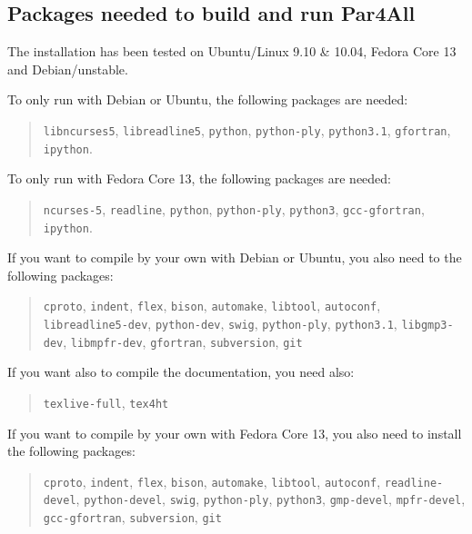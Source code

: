 \documentclass[a4paper]{article}
\begin{document}
\subsection{Packages needed to build and run Par4All}
\label{sec:pack-need-build}

The installation has been tested on Ubuntu/Linux 9.10 \& 10.04,
Fedora Core 13 and Debian/unstable.

To only run \Apfa with Debian or Ubuntu, the following packages are needed:
\begin{quote}
  \texttt{libncurses5}, \texttt{libreadline5}, \texttt{python},
  \texttt{python-ply}, \texttt{python3.1}, \texttt{gfortran},
  \texttt{ipython}.
\end{quote}

To only run \Apfa with Fedora Core 13, the following packages are needed:
\begin{quote}
  \texttt{ncurses-5}, \texttt{readline}, \texttt{python},
  \texttt{python-ply}, \texttt{python3}, \texttt{gcc-gfortran},
  \texttt{ipython}.
\end{quote}


If you want to compile \Apfa by your own with Debian or Ubuntu, you also
need to the following packages:
\begin{quote}
  \texttt{cproto}, \texttt{indent}, \texttt{flex}, \texttt{bison},
  \texttt{automake}, \texttt{libtool}, \texttt{autoconf},
  \texttt{libreadline5-dev}, \texttt{python-dev}, \texttt{swig},
  \texttt{python-ply}, \texttt{python3.1}, \texttt{libgmp3-dev},
  \texttt{libmpfr-dev}, \texttt{gfortran}, \texttt{subversion},
  \texttt{git}
\end{quote}

If you want also to compile the documentation, you need also:
\begin{quote}
  \texttt{texlive-full}, \texttt{tex4ht}
\end{quote}

If you want to compile \Apfa by your own with Fedora Core 13, you also
need to install the following packages:
\begin{quote}
  \texttt{cproto}, \texttt{indent}, \texttt{flex}, \texttt{bison},
  \texttt{automake}, \texttt{libtool}, \texttt{autoconf},
  \texttt{readline-devel}, \texttt{python-devel}, \texttt{swig},
  \texttt{python-ply}, \texttt{python3}, \texttt{gmp-devel},
  \texttt{mpfr-devel}, \texttt{gcc-gfortran}, \texttt{subversion},
  \texttt{git}
\end{quote}
\end{document}
